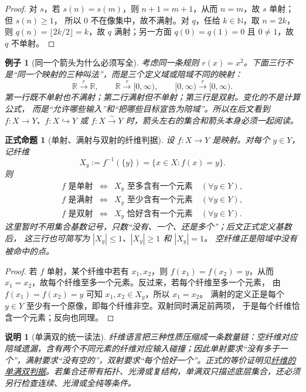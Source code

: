 \documentclass[UTF8,fontset=none,a4paper,11pt]{ctexart}
\theoremstyle{foundation-definition}
\theoremstyle{foundation-theorem}
\theoremstyle{foundation-proposition}
\newtheorem{proposition}[definition]{正式命题}
\theoremstyle{foundation-example}
\newtheorem{example}[definition]{例子}
\theoremstyle{foundation-remark}
\newtheorem{remark}[definition]{说明}
\theoremstyle{foundation-theorem}
\newcommand{\term}[2]{\hyperref[#1]{#2}}
\begin{document}
\begin{proof}
对 $s$，若 $s(n)=s(m)$，则 $n+1=m+1$，从而 $n=m$，故 $s$ 单射；但 $s(n)\ge1$，
所以 $0$ 不在像集中，故不满射。对 $q$，任给 $k\in\mathbb N$，取 $n=2k$，则
\(q(n)=\lfloor 2k/2\rfloor=k\)，故 $q$ 满射；另一方面
\(q(0)=q(1)=0\) 且 $0\ne1$，故 $q$ 不单射。
\end{proof}

\begin{example}[同一个箭头为什么必须写全]
考虑同一条规则 $r(x)=x^2$。下面三行不是“同一个映射的三种叫法”，而是三个定义域或陪域不同的映射：
\[
  \mathbb R\xrightarrow{\ r\ }\mathbb R,
  \qquad
  \mathbb R\xrightarrow{\ r\ }[0,\infty),
  \qquad
  [0,\infty)\xrightarrow{\ r\ }[0,\infty).
\]
第一行既不单射也不满射；第二行满射但不单射；第三行是双射。变化的不是计算公式，
而是“允许哪些输入”和“把哪些目标宣告为陪域”。所以在后文看到
\(f:X\to Y\)、\(f:X\hookrightarrow Y\) 或 \(f:X\xrightarrow{\sim}Y\) 时，箭头左右的集合和箭头本身必须一起阅读。
\end{example}

\begin{proposition}[单射、满射与双射的纤维判据]\label{prop:fiber-single-surj-bijective}
设 \(f:X\to Y\) 是映射。对每个 \(y\in Y\)，记纤维
\[
  X_y:=f^{-1}(\{y\})=\{x\in X:f(x)=y\}.
\]
则
\[
\begin{array}{rcl}
 f\text{ 是单射} &\Longleftrightarrow& X_y\text{ 至多含有一个元素}\quad(\forall y\in Y),\\[0.25em]
 f\text{ 是满射} &\Longleftrightarrow& X_y\text{ 至少含有一个元素}\quad(\forall y\in Y),\\[0.25em]
 f\text{ 是双射} &\Longleftrightarrow& X_y\text{ 恰好含有一个元素}\quad(\forall y\in Y).
\end{array}
\]
这里暂时不用集合基数记号，只数“没有、一个、还是多个”；后文正式定义基数后，
这三行也可简写为 \(|X_y|\le1\)、\(|X_y|\ge1\) 和 \(|X_y|=1\)。
空纤维正是陪域中没有被命中的点。
\end{proposition}

\begin{proof}
若 \(f\) 单射，某个纤维中若有 \(x_1,x_2\)，则
\(f(x_1)=f(x_2)=y\)，从而 \(x_1=x_2\)，故每个纤维至多一个元素。反过来，若每个纤维至多一个元素，
由 \(f(x_1)=f(x_2)=y\) 可知 \(x_1,x_2\in X_y\)，所以 \(x_1=x_2\)。
满射的定义正是每个 \(y\in Y\) 至少有一个原像，即每个纤维非空。双射同时满足前两项，
于是每个纤维恰含一个元素；反向也同理。
\end{proof}

\begin{remark}[单满双的统一读法]\label{rem:single-surj-bijective-read}
纤维语言把三种性质压缩成一条数量链：空纤维对应陪域遗漏，含有两个不同元素的纤维对应输入碰撞；因此单射要求“没有多于一个”，满射要求“没有空的”，双射要求“每个恰好一个”。正式的等价证明见\term{prop:fiber-single-surj-bijective}{纤维的单满双判据}。若集合还带有拓扑、光滑或复结构，单满双只描述底层集合，还必须另行检查连续、光滑或全纯等条件。
\end{remark}
\end{document}
